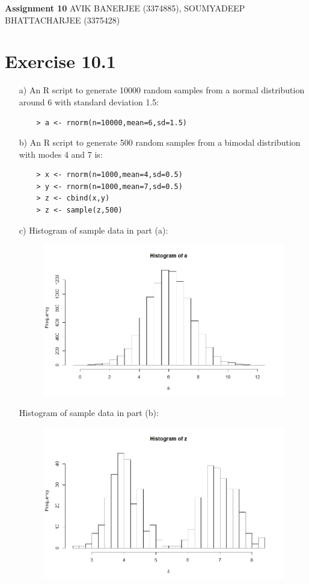\documentclass[a4paper]{article}
\begin{document}
	\begin{center}
		\textbf{\LARGE Assignment 10}\linebreak\linebreak
		{\large AVIK BANERJEE (3374885), SOUMYADEEP BHATTACHARJEE (3375428)}
	\end{center}
\section*{Exercise 10.1}
\begin{enumerate}
	\item[a)] An R script to generate 10000 random samples from a normal distribution around 6 with standard deviation 1.5:
	\begin{verbatim}
	> a <- rnorm(n=10000,mean=6,sd=1.5)
	\end{verbatim}
	\item[b)] An R script to generate 500 random samples from a bimodal distribution with modes 4 and 7 is:
	\begin{verbatim}
	> x <- rnorm(n=1000,mean=4,sd=0.5)
	> y <- rnorm(n=1000,mean=7,sd=0.5)
	> z <- cbind(x,y)
	> z <- sample(z,500)
	\end{verbatim}
	\item[c)] Histogram of sample data in part (a):
	\begin{figure}[H]
		\includegraphics[width=\linewidth]{hist_1.jpeg}
	\end{figure}
	Histogram of sample data in part (b):
	\begin{figure}[H]
		\includegraphics[width=\linewidth]{hist_2.jpeg}

\end{figure}
\end{enumerate}
\end{document}
